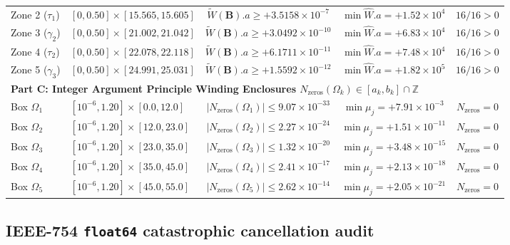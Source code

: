 \documentclass[11pt,a4paper,reqno]{amsart}
\theoremstyle{definition}
\theoremstyle{remark}
\numberwithin{equation}{section}
\newcommand{\Wtil}{\widetilde{W}}
\newcommand{\What}{\widehat{W}}
\begin{document}
\begin{table}[htbp]
\begin{tabular}{llccc}
Zone 2 ($\tau_1$)   & $[0, 0.50] \times [15.565, 15.605]$ & $\Wtil(\mathbf{B}).a \ge +3.5158 \times 10^{-7}$  & $\min\What.a = +1.52 \times 10^4$ & $16/16 > 0$ \\
Zone 3 ($\gamma_2$) & $[0, 0.50] \times [21.002, 21.042]$ & $\Wtil(\mathbf{B}).a \ge +3.0492 \times 10^{-10}$ & $\min\What.a = +6.83 \times 10^4$ & $16/16 > 0$ \\
Zone 4 ($\tau_2$)   & $[0, 0.50] \times [22.078, 22.118]$ & $\Wtil(\mathbf{B}).a \ge +6.1711 \times 10^{-11}$ & $\min\What.a = +7.48 \times 10^4$ & $16/16 > 0$ \\
Zone 5 ($\gamma_3$) & $[0, 0.50] \times [24.991, 25.031]$ & $\Wtil(\mathbf{B}).a \ge +1.5592 \times 10^{-12}$ & $\min\What.a = +1.82 \times 10^5$ & $16/16 > 0$ \\
\midrule
\multicolumn{5}{l}{\textbf{Part C: Integer Argument Principle Winding Enclosures $N_{\mathrm{zeros}}(\Omega_k) \in [a_k, b_k] \cap \mathbb{Z}$}} \\
Box $\Omega_1$ & $[10^{-6}, 1.20] \times [0.0, 12.0]$  & $|N_{\mathrm{zeros}}(\Omega_1)| \le 9.07 \times 10^{-33}$ & $\min \mu_j = +7.91 \times 10^{-3}$  & $N_{\mathrm{zeros}} = 0$ \\
Box $\Omega_2$ & $[10^{-6}, 1.20] \times [12.0, 23.0]$ & $|N_{\mathrm{zeros}}(\Omega_2)| \le 2.27 \times 10^{-24}$ & $\min \mu_j = +1.51 \times 10^{-11}$ & $N_{\mathrm{zeros}} = 0$ \\
Box $\Omega_3$ & $[10^{-6}, 1.20] \times [23.0, 35.0]$ & $|N_{\mathrm{zeros}}(\Omega_3)| \le 1.32 \times 10^{-20}$ & $\min \mu_j = +3.48 \times 10^{-15}$ & $N_{\mathrm{zeros}} = 0$ \\
Box $\Omega_4$ & $[10^{-6}, 1.20] \times [35.0, 45.0]$ & $|N_{\mathrm{zeros}}(\Omega_4)| \le 2.41 \times 10^{-17}$ & $\min \mu_j = +2.13 \times 10^{-18}$ & $N_{\mathrm{zeros}} = 0$ \\
Box $\Omega_5$ & $[10^{-6}, 1.20] \times [45.0, 55.0]$ & $|N_{\mathrm{zeros}}(\Omega_5)| \le 2.62 \times 10^{-14}$ & $\min \mu_j = +2.05 \times 10^{-21}$ & $N_{\mathrm{zeros}} = 0$ \\
\bottomrule
\end{tabular}
\end{table}

\subsection{IEEE-754 \texorpdfstring{\texttt{float64}}{float64} catastrophic cancellation audit}\label{subsec:num_gpu}
\end{document}
